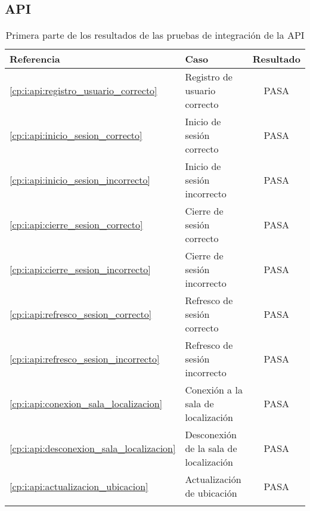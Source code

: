 \subsection{API}

\begin{longtable}{ l l c }
    \hline
    Referencia & Caso & Resultado \\
    \hline
    \ref{cp:i:api:registro_usuario_correcto} & Registro de usuario correcto & PASA \\
    \ref{cp:i:api:inicio_sesion_correcto} & Inicio de sesión correcto & PASA \\
    \ref{cp:i:api:inicio_sesion_incorrecto} & Inicio de sesión incorrecto & PASA \\
    \ref{cp:i:api:cierre_sesion_correcto} & Cierre de sesión correcto & PASA \\
    \ref{cp:i:api:cierre_sesion_incorrecto} & Cierre de sesión incorrecto & PASA \\
    \ref{cp:i:api:refresco_sesion_correcto} & Refresco de sesión correcto & PASA \\
    \ref{cp:i:api:refresco_sesion_incorrecto} & Refresco de sesión incorrecto & PASA \\ \hline
    \ref{cp:i:api:conexion_sala_localizacion} & Conexión a la sala de localización & PASA \\
    \ref{cp:i:api:desconexion_sala_localizacion} & Desconexión de la sala de localización & PASA \\
    \ref{cp:i:api:actualizacion_ubicacion} & Actualización de ubicación & PASA \\ \hline
    \caption{Primera parte de los resultados de las pruebas de integración de la API}
\end{longtable}

